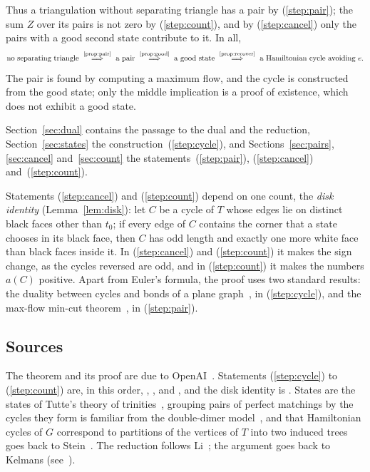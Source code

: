 \documentclass[a4paper]{amsart}
\numberwithin{equation}{section}
\theoremstyle{definition}
\begin{document}
Thus a triangulation without separating triangle has a pair by (\ref{step:pair}); the sum $Z$ over its pairs is not zero by (\ref{step:count}), and by (\ref{step:cancel}) only the pairs with a good second state contribute to it.
In all,
\begin{equation}\label{eq:chain}
\text{no separating triangle}
\ \overset{\text{\ref{prop:pair}}}{\Longrightarrow}\
\text{a pair}
\ \overset{\text{\ref{prop:good}}}{\Longrightarrow}\
\text{a good state}
\ \overset{\text{\ref{prop:recover}}}{\Longrightarrow}\
\text{a Hamiltonian cycle avoiding $e$.}
\end{equation}
The pair is found by computing a maximum flow, and the cycle is constructed from the good state; only the middle implication is a proof of existence, which does not exhibit a good state.

Section~\ref{sec:dual} contains the passage to the dual and the reduction, Section~\ref{sec:states} the construction~(\ref{step:cycle}), and Sections~\ref{sec:pairs}, \ref{sec:cancel} and~\ref{sec:count} the statements~(\ref{step:pair}), (\ref{step:cancel}) and~(\ref{step:count}).

Statements (\ref{step:cancel}) and (\ref{step:count}) depend on one count, the \emph{disk identity} (Lemma~\ref{lem:disk}): let $C$ be a cycle of $T$ whose edges lie on distinct black faces other than $t_0$; if every edge of $C$ contains the corner that a state chooses in its black face, then $C$ has odd length and exactly one more white face than black faces inside it.
In (\ref{step:cancel}) and (\ref{step:count}) it makes the sign change, as the cycles reversed are odd, and in (\ref{step:count}) it makes the numbers $a(C)$ positive.
Apart from Euler's formula, the proof uses two standard results: the duality between cycles and bonds of a plane graph~\cite[Proposition~4.6.1]{Diestel}, in (\ref{step:cycle}), and the max-flow min-cut theorem~\cite{FordFulkerson}, in (\ref{step:pair}).

\subsection*{Sources}
The theorem and its proof are due to OpenAI~\cite{OpenAI}.
Statements (\ref{step:cycle}) to (\ref{step:count}) are, in this order, \cite[Section~6]{OpenAI}, \cite[Proposition~3.1]{OpenAI}, \cite[Lemma~5.2]{OpenAI} and \cite[Proposition~5.1]{OpenAI}, and the disk identity is \cite[Lemma~4.1]{OpenAI}.
States are the states of Tutte's theory of trinities~\cite{TutteTrinity,HineKalman}, grouping pairs of perfect matchings by the cycles they form is familiar from the double-dimer model~\cite{Kenyon}, and that Hamiltonian cycles of $G$ correspond to partitions of the vertices of $T$ into two induced trees goes back to Stein~\cite[Theorem~2.2]{Stein}.
The reduction follows Li~\cite[Theorem~3]{Li}; the argument goes back to Kelmans (see~\cite[Theorem~8]{Alt}).
\end{document}
